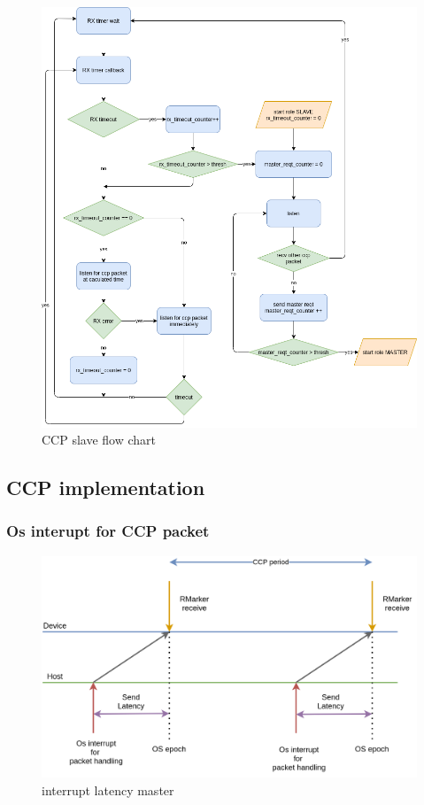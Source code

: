 \documentclass[\main/main.tex]{subfiles}
\begin{document}
\begin{figure}[H]
    \begin{center}
        \includegraphics[scale=0.5]{ccp_slave_flow_chart.png}
    \end{center}
    \caption{CCP slave flow chart}
    \label{fig:ccp_slave_flow_chart}
\end{figure}

\subsection{CCP implementation}

\subsubsection{Os interupt for CCP packet}
\begin{figure}[H]
    \begin{center}
        \includegraphics[scale=0.35]{interupt_latency_master.png}
    \end{center}
    \caption{interrupt latency master}
    \label{fig:interupt_latency_master}
\end{figure}
\end{document}
